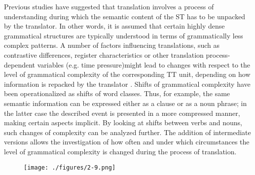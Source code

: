 \documentclass[output=paper]{LSP/langsci}
\begin{document}
Previous studies have suggested that translation involves a process of understanding during which the semantic content of the ST has to be unpacked by the translator. In other words, it is assumed that certain highly dense grammatical structures are typically understood in terms of grammatically less complex patterns. A number of factors influencing translations, such as contrastive differences, register characteristics or other translation process-dependent variables (e.g. time pressure)might lead to changes with respect to the level of grammatical complexity of the corresponding TT unit, depending on how information is repacked by the translator \citep{Steiner2001,Hansen-Schirra2012}. Shifts of grammatical complexity have been operationalized as shifts of word classes. Thus, for example, the same semantic information can be expressed either as a clause or as a noun phrase; in the latter case the described event is presented in a more compressed manner, making certain aspects implicit. By looking at shifts between verbs and nouns, such changes of complexity can be analyzed further. The addition of intermediate versions allows the investigation of how often and under which circumstances the level of grammatical complexity is changed during the process of translation. 

\begin{figure}
\texttt{[image: ./figures/2-9.png]}
\end{figure}


\end{document}
